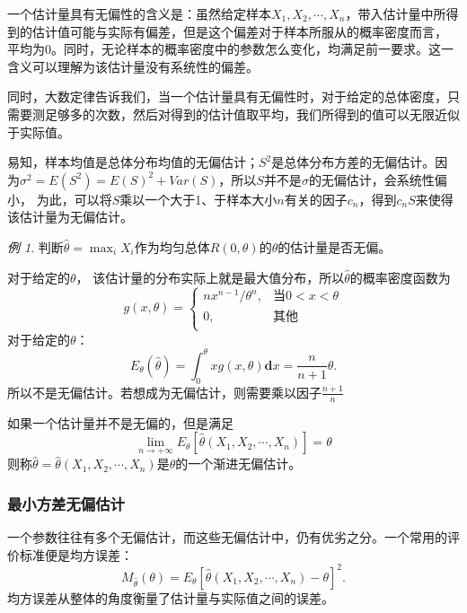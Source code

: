 \documentclass[a4paper,11pt]{article}%
\theoremstyle{remark}
\theoremstyle{remark}
\newtheorem*{example}{例}
\theoremstyle{definition}
\theoremstyle{definition}
\theoremstyle{plain}
\begin{document}
一个估计量具有无偏性的含义是：虽然给定样本$X_1,X_2,\cdots,X_n$，带入估计量中所得到的估计值可能与实际有偏差，但是这个偏差对于样本所服从的概率密度而言，
平均为0。同时，无论样本的概率密度中的参数怎么变化，均满足前一要求。这一含义可以理解为该估计量没有系统性的偏差。

同时，大数定律告诉我们，当一个估计量具有无偏性时，对于给定的总体密度，只需要测足够多的次数，然后对得到的估计值取平均，我们所得到的值可以无限近似于实际值。

易知，样本均值是总体分布均值的无偏估计；$S^2$是总体分布方差的无偏估计。因为$\sigma^2=E(S^2)=E(S)^2+Var(S)$，所以$S$并不是$\sigma$的无偏估计，会系统性偏小，
为此，可以将$S$乘以一个大于1、于样本大小$n$有关的因子$c_n$，得到$c_nS$来使得该估计量为无偏估计。

\begin{example}
    判断$\hat{\theta}=\max_i{X_i}$作为均匀总体$R(0,\theta)$的$\theta$的估计量是否无偏。

    对于给定的$\theta$， 该估计量的分布实际上就是最大值分布，所以$\hat{\theta}$的概率密度函数为 
    \[g(x,\theta)=\begin{cases}
        nx^{n-1}/\theta^n,& \text{当}0<x<\theta\\
        0,& \text{其他}\\
    \end{cases}\]
    对于给定的$\theta$：
    \[E_{\theta}(\hat{\theta})=\int_{0}^{\theta}xg(x,\theta)\mathbf{d}x=\frac{n}{n+1}\theta.\]
    所以不是无偏估计。若想成为无偏估计，则需要乘以因子$\frac{n+1}{n}$
\end{example}
如果一个估计量并不是无偏的，但是满足 
\[\lim_{n\rightarrow+\infty}E_{\theta}[\hat{\theta}(X_1,X_2,\cdots,X_n)]=\theta\]
则称$\hat{\theta}=\hat{\theta}(X_1,X_2,\cdots,X_n)$是$\theta$的一个渐进无偏估计。
\subsubsection{最小方差无偏估计}
一个参数往往有多个无偏估计，而这些无偏估计中，仍有优劣之分。一个常用的评价标准便是均方误差：
\[M_{\hat{\theta}}(\theta)=E_{\theta}[\hat{\theta}(X_1,X_2,\cdots,X_n)-\theta]^2.\]
均方误差从整体的角度衡量了估计量与实际值之间的误差。
\end{document}
